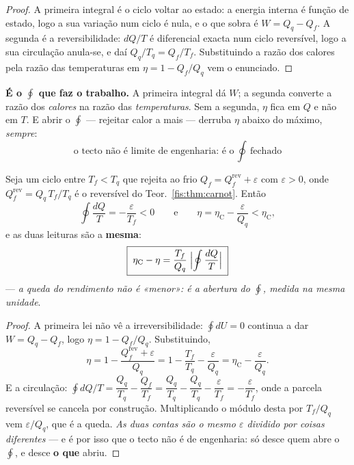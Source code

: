 \documentclass[livro.tex]{subfiles}
\begin{document}
\begin{proof}
A primeira integral é o ciclo voltar ao estado: a energia interna é função de
estado, logo a sua variação num ciclo é nula, e o que sobra é $W=Q_q-Q_f$. A
segunda é a reversibilidade: $dQ/T$ é diferencial exacta num ciclo reversível,
logo a sua circulação anula-se, e daí $Q_q/T_q=Q_f/T_f$. Substituindo a razão dos
calores pela razão das temperaturas em $\eta=1-Q_f/Q_q$ vem o enunciado.
\end{proof}

\medskip\noindent\textbf{É o $\oint$ que faz o trabalho.} A primeira integral dá
$W$; a segunda converte a razão dos \emph{calores} na razão das
\emph{temperaturas}. Sem a segunda, $\eta$ fica em $Q$ e não em $T$. E abrir o
$\oint$ --- rejeitar calor a mais --- derruba $\eta$ abaixo do máximo,
\emph{sempre}:
\[
\boxed{\;\text{o tecto não é limite de engenharia: é o }\oint\text{ fechado}\;}
\]

\begin{corolario}\label{fis:cor:irrever}
Seja um ciclo entre $T_f<T_q$ que rejeita ao frio
$Q_f=Q_f^{\text{rev}}+\varepsilon$ com $\varepsilon>0$, onde
$Q_f^{\text{rev}}=Q_q\,T_f/T_q$ é o reversível do Teor.~\ref{fis:thm:carnot}.
Então
\[
\oint\frac{dQ}{T}=-\frac{\varepsilon}{T_f}<0
\qquad\text{e}\qquad
\eta=\eta_{\text{C}}-\frac{\varepsilon}{Q_q}<\eta_{\text{C}} ,
\]
e as duas leituras são a \textbf{mesma}:
\[
\boxed{\;\eta_{\text{C}}-\eta
=\frac{T_f}{Q_q}\;\Bigl\lvert\oint\frac{dQ}{T}\Bigr\rvert\;}
\]
--- \emph{a queda do rendimento não é «menor»: é a abertura do $\oint$, medida na
mesma unidade}.
\end{corolario}

\begin{proof}
A primeira lei não vê a irreversibilidade: $\oint dU=0$ continua a dar
$W=Q_q-Q_f$, logo $\eta=1-Q_f/Q_q$. Substituindo,
\[
\eta=1-\frac{Q_f^{\text{rev}}+\varepsilon}{Q_q}
    =1-\frac{T_f}{T_q}-\frac{\varepsilon}{Q_q}
    =\eta_{\text{C}}-\frac{\varepsilon}{Q_q} .
\]
E a circulação:
$\oint dQ/T=\dfrac{Q_q}{T_q}-\dfrac{Q_f}{T_f}
=\dfrac{Q_q}{T_q}-\dfrac{Q_q}{T_q}-\dfrac{\varepsilon}{T_f}
=-\dfrac{\varepsilon}{T_f}$, onde a parcela reversível se cancela por
construção. Multiplicando o módulo desta por $T_f/Q_q$ vem $\varepsilon/Q_q$, que
é a queda. \emph{As duas contas são o mesmo $\varepsilon$ dividido por coisas
diferentes} --- e é por isso que o tecto não é de engenharia: só desce quem abre
o $\oint$, e desce \textbf{o que} abriu.
\end{proof}
\end{document}

